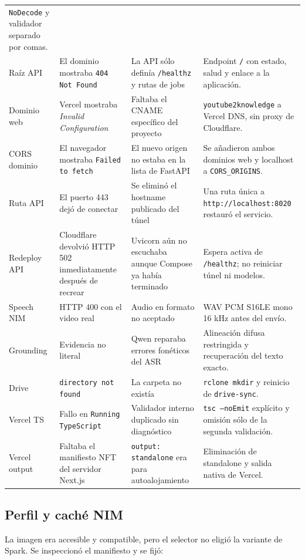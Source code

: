 \documentclass[11pt,a4paper]{article}
\begin{document}
\begin{longtable}{@{}p{}p{}p{}p{}@{}}
    \texttt{NoDecode} y validador separado por comas. \\
  \addlinespace
  Raíz API & El dominio mostraba \texttt{404 Not Found} &
    La API sólo definía \texttt{/healthz} y rutas de jobs &
    Endpoint \texttt{/} con estado, salud y enlace a la aplicación. \\
  \addlinespace
  Dominio web & Vercel mostraba \emph{Invalid Configuration} &
    Faltaba el CNAME específico del proyecto &
    \texttt{youtube2knowledge} a Vercel DNS, sin proxy de Cloudflare. \\
  \addlinespace
  CORS dominio & El navegador mostraba \texttt{Failed to fetch} &
    El nuevo origen no estaba en la lista de FastAPI &
    Se añadieron ambos dominios web y localhost a \texttt{CORS\_ORIGINS}. \\
  \addlinespace
  Ruta API & El puerto 443 dejó de conectar &
    Se eliminó el hostname publicado del túnel &
    Una ruta única a \texttt{http://localhost:8020} restauró el servicio. \\
  \addlinespace
  Redeploy API & Cloudflare devolvió HTTP 502 inmediatamente después de recrear &
    Uvicorn aún no escuchaba aunque Compose ya había terminado &
    Espera activa de \texttt{/healthz}; no reiniciar túnel ni modelos. \\
  \addlinespace
  Speech NIM & HTTP 400 con el video real &
    Audio en formato no aceptado &
    WAV PCM S16LE mono 16 kHz antes del envío. \\
  \addlinespace
  Grounding & Evidencia no literal &
    Qwen reparaba errores fonéticos del ASR &
    Alineación difusa restringida y recuperación del texto exacto. \\
  \addlinespace
  Drive & \texttt{directory not found} &
    La carpeta no existía &
    \texttt{rclone mkdir} y reinicio de \texttt{drive-sync}. \\
  \addlinespace
  Vercel TS & Fallo en \texttt{Running TypeScript} &
    Validador interno duplicado sin diagnóstico &
    \texttt{tsc --noEmit} explícito y omisión sólo de la segunda validación. \\
  \addlinespace
  Vercel output & Faltaba el manifiesto NFT del servidor Next.js &
    \texttt{output: standalone} era para autoalojamiento &
    Eliminación de standalone y salida nativa de Vercel. \\
  \bottomrule
\end{longtable}
\normalsize

\subsection{Perfil y caché NIM}
La imagen era accesible y compatible, pero el selector no eligió la variante de
Spark. Se inspeccionó el manifiesto y se fijó:
\end{document}
